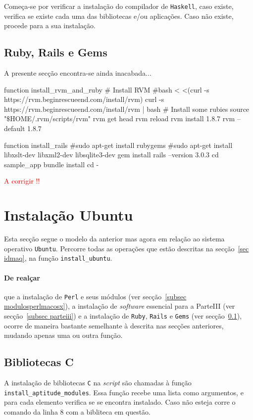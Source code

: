 Começa-se por verificar a instalação do compilador de \texttt{Haskell}, caso existe, verifica se existe cada uma das bibliotecas e/ou aplicações. Caso não existe, procede para a sua 
instalação.

\subsection{Ruby, Rails e Gems}\label{subsec rrgems}

A presente secção encontra-se ainda inacabada...

\begin{myxml}
 function install_rvm_and_ruby {
        # Install RVM
        #bash < <(curl -s https://rvm.beginrescueend.com/install/rvm)
        curl -s https://rvm.beginrescueend.com/install/rvm | bash
        # Install some rubies
        source "$\$$HOME/.rvm/scripts/rvm"
        rvm get head
        rvm reload
        rvm install 1.8.7
        rvm --default 1.8.7
}

function install_rails {
        #sudo apt-get install rubygems
        #sudo apt-get install libxslt-dev libxml2-dev libsqlite3-dev
        gem install rails --version 3.0.3
        cd sample_app
        bundle install
        cd -
}
\end{myxml}

\textcolor{red}{A corrigir !!}

\section{Instalação Ubuntu}
Esta secção segue o modelo da anterior mas agora em relação ao sistema operativo \texttt{Ubuntu}. Percorre todas as operações que estão descritas na secção~\ref{sec idmaq}, na 
função \texttt{install\_ubuntu}.

\paragraph{De realçar} que a instalação de \texttt{Perl} e seus módulos (ver secção~\ref{subsec modulosperlmacosx}), a instalação de \emph{software} essencial para a ParteIII
(ver secção~\ref{subsec parteiii}) e a instalação de \texttt{Ruby}, \texttt{Rails} e \texttt{Gems} (ver secção~\ref{subsec rrgems}), ocorre de maneira bastante semelhante à descrita 
nas secções anteriores, mudando apenas uma ou outra função. 

\subsection{Bibliotecas C}
A instalação de bibliotecas \texttt{C} na \emph{script} são chamadas à função \texttt{install\_aptitude\_modules}. Essa função recebe uma lista como argumentos, e para cada elemento 
verifica se se encontra instalado. Caso não esteja corre o comando da linha 8 com a bibliteca em questão.\\

